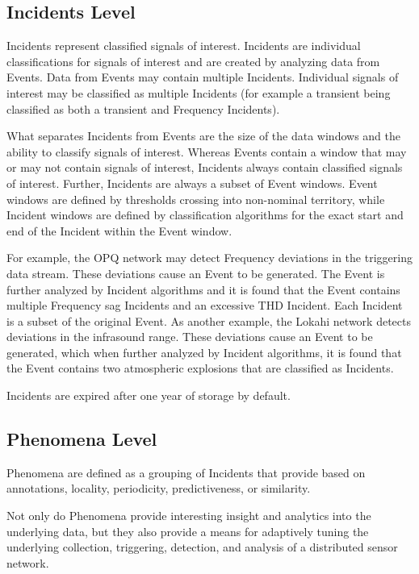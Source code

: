\subsection{Incidents Level}\label{subsec:incidents-level}
Incidents represent classified signals of interest. Incidents are individual classifications for signals of interest and are created by analyzing data from Events. Data from Events may contain multiple Incidents. Individual signals of interest may be classified as multiple Incidents (for example a transient being classified as both a transient and Frequency Incidents).

What separates Incidents from Events are the size of the data windows and the ability to classify signals of interest. Whereas Events contain a window that may or may not contain signals of interest, Incidents always contain classified signals of interest. Further, Incidents are always a subset of Event windows. Event windows are defined by thresholds crossing into non-nominal territory, while Incident windows are defined by classification algorithms for the exact start and end of the Incident within the Event window.

For example, the OPQ network may detect Frequency deviations in the triggering data stream. These deviations cause an Event to be generated. The Event is further analyzed by Incident algorithms and it is found that the Event contains multiple Frequency sag Incidents and an excessive THD Incident. Each Incident is a subset of the original Event. As another example, the Lokahi network detects deviations in the infrasound range. These deviations cause an Event to be generated, which when further analyzed by Incident algorithms, it is found that the Event contains two atmospheric explosions that are classified as Incidents.

Incidents are expired after one year of storage by default.

\subsection{Phenomena Level}\label{subsec:phenomena-level}
Phenomena are defined as a grouping of Incidents that provide based on annotations, locality, periodicity, predictiveness, or similarity.

Not only do Phenomena provide interesting insight and analytics into the underlying data, but they also provide a means for adaptively tuning the underlying collection, triggering, detection, and analysis of a distributed sensor network.


